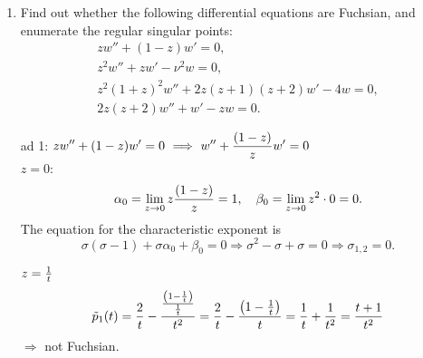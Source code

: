 {\begin{enumerate}
Note that $y_2(z)$ already represents the general solution of (\ref{2016-m-ch-sf-efmEu}).
Alternatively we could have started from $y_1(z)$ and applied d'Alambert's {\it Ansatz}
(\ref{2011-m-ch-sf-dalambansatz})--(\ref{2011-m-ch-sf-fc2123}):
\begin{equation}
v' (z) + v (z)\left(\frac{2}{z} + \frac{1}{z}\right) = 0 \textrm{, or } v' (z) = - \frac{3 v (z)}{z}
\end{equation}
yields
\begin{equation}
\frac{d v}{v} = - 3\frac{d z}{z} \textrm{, and }\log v = -3 \log z \textrm{, or } v(z) = z^{-3}.
\end{equation}
Therefore, according to (\ref{2011-m-ch-sf-dalambansatz}),
\begin{equation}
y_2(z) = y_1(z) \int_z  v(s) ds  = A z \left(-\frac{1}{2z^2}\right) = \frac{A'}{z}  .
\end{equation}








\item
Find out whether the following differential equations are Fuchsian,
and enumerate the regular singular points:
\begin{equation}
\begin{split}
zw''+(1-z)w'=0 ,  \\
z^2w''+zw'-\nu ^2 w=0 ,  \\
z^2(1+z)^2w''+2z(z+1)(z+2)w'-4w=0 , \\
2z(z+2)w'' +w' -zw=0.
\end{split}
\end{equation}

{ ad 1:} $\displaystyle zw''+(1-z)w'=0\ \Longrightarrow
\ w''+{(1-z)\over z}w'=0$\\[2ex]
 {$z=0$:}
$$
   \alpha_0=\lim_{z\to0}z{(1-z)\over z}=1,\quad
   \beta_0=\lim_{z\to0}z^2\cdot0=0.
$$
The equation for the characteristic exponent is
$$
   \sigma(\sigma-1)+\sigma\alpha_0+\beta_0=0\Longrightarrow
   \sigma^2-\sigma+\sigma=0\Longrightarrow\sigma_{1,2}=0.
$$

\bigskip

 $  z={1\over t}$
$$
   \tilde p_1(t)={2\over t}-{{\left(1-{1\over t}\right)\over{1\over t}}\over
   t^2}={2\over t}-{\left(1-{1\over t}\right)\over t}={1\over t}
   +{1\over t^2}={t+1\over t^2}
$$
$\Longrightarrow$ not Fuchsian.


\end{enumerate}}
